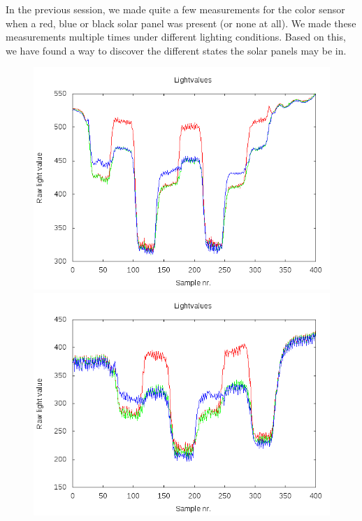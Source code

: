 In the previous session, we made quite a few measurements for the color
sensor when a red, blue or black solar panel was present (or none at
all). We made these measurements multiple times under different lighting
conditions. Based on this, we have found a way to discover the different
states the solar panels may be in.
\begin{figure}[hbt]
  \centering
  \includegraphics[scale=0.35]{../experiments/2prototype/results/gnuplot/Colormesrun1.png}
  \includegraphics[scale=0.35]{../experiments/2prototype/results/gnuplot/Colormesrun2.png}

\end{figure}

